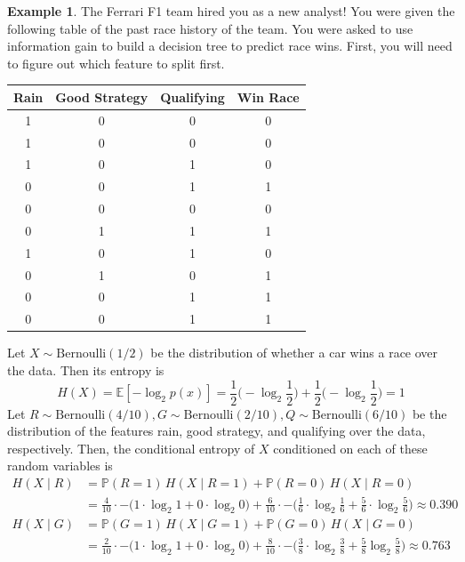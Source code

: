 \documentclass{article}
\theoremstyle{definition}
\newtheorem{example}{Example}[section]
\begin{document}
  \begin{example}
  The Ferrari F1 team hired you as a new analyst! You were given the following table of the past race history of the team. You were asked to use information gain to build a decision tree to predict race wins. First, you will need to figure out which feature to split first. 

  \begin{center}
  \begin{tabular}[c]{c|c|c||c}
  Rain & Good Strategy & Qualifying & Win Race \\ \hline
  1 & 0 & 0 & 0 \\
  1 & 0 & 0 & 0 \\
  1 & 0 & 1 & 0 \\
  0 & 0 & 1 & 1 \\
  0 & 0 & 0 & 0 \\
  0 & 1 & 1 & 1 \\
  1 & 0 & 1 & 0 \\
  0 & 1 & 0 & 1 \\
  0 & 0 & 1 & 1 \\
  0 & 0 & 1 & 1 \\
  \end{tabular}
  \end{center}
  Let $X \sim \mathrm{Bernoulli}(1/2)$ be the distribution of whether a car wins a race over the data. Then its entropy is 
  \[H(X) = \mathbb{E}[-\log_2 p(x)] = \frac{1}{2} \big( -\log_2 \frac{1}{2} \big) + \frac{1}{2} \big( -\log_2 \frac{1}{2} \big) = 1\]
  Let $R \sim \mathrm{Bernoulli}(4/10), G \sim \mathrm{Bernoulli}(2/10), Q \sim \mathrm{Bernoulli}(6/10)$ be the distribution of the features rain, good strategy, and qualifying over the data, respectively. Then, the conditional entropy of $X$ conditioned on each of these random variables is 
  \begin{align*}
      H(X \mid R) & = \mathbb{P}(R = 1)\, H(X \mid R = 1) + \mathbb{P}(R = 0) \, H(X \mid R = 0) \\
      & = \frac{4}{10} \cdot - \big( 1 \cdot \log_2 1 + 0 \cdot \log_2 0 \big) + \frac{6}{10} \cdot - \big( \frac{1}{6} \cdot \log_2 \frac{1}{6} + \frac{5}{6} \cdot \log_2 \frac{5}{6} \big) \approx 0.390 \\
      H(X \mid G) & =  \mathbb{P}(G = 1)\, H(X \mid G = 1) + \mathbb{P}(G = 0) \, H(X \mid G = 0) \\
      & = \frac{2}{10} \cdot - \big( 1 \cdot \log_2 1 + 0 \cdot \log_2 0 \big) + \frac{8}{10} \cdot - \big( \frac{3}{8} \cdot \log_2 \frac{3}{8} + \frac{5}{8} \log_2 \frac{5}{8} \big) \approx 0.763\\

\end{align*}
\end{example}
\end{document}
